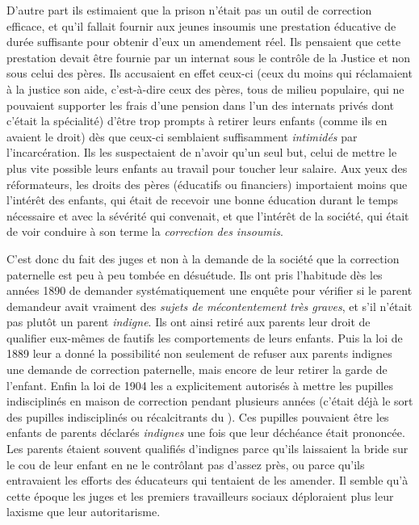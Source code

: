  D'autre part ils estimaient que la prison n'était pas un outil de correction efficace, et qu'il fallait fournir aux jeunes insoumis une prestation éducative de durée suffisante pour obtenir d'eux un amendement réel. Ils pensaient que cette prestation devait être fournie par un internat sous le contrôle de la Justice et non sous celui des pères. Ils accusaient en effet ceux-ci (ceux du moins qui réclamaient à la justice son aide, c'est-à-dire ceux des pères, tous de milieu populaire, qui ne pouvaient supporter les frais d'une pension dans l'un des internats privés dont c'était la spécialité) d'être trop prompts à retirer leurs enfants (comme ils en avaient le droit) dès que ceux-ci semblaient suffisamment \emph{intimidés} par l'incarcération. Ils les suspectaient de n'avoir qu'un seul but, celui de mettre le plus vite possible leurs enfants au travail pour toucher leur salaire. Aux yeux des réformateurs, les droits des pères (éducatifs ou financiers) importaient moins que l'intérêt des enfants, qui était de recevoir une bonne éducation durant le temps nécessaire et avec la sévérité qui convenait, et que l'intérêt de la société, qui était de voir conduire à son terme la \emph{correction des insoumis}. 

 C'est donc du fait des juges et non à la demande de la société que la correction paternelle est peu à peu tombée en désuétude. Ils ont pris l'habitude dès les années 1890 de demander systématiquement une enquête pour vérifier si le parent demandeur avait vraiment des \emph{sujets de mécontentement très graves}, et s'il n'était pas plutôt un parent \emph{indigne}. Ils ont ainsi retiré aux parents leur droit de qualifier eux-mêmes de fautifs les comportements de leurs enfants. Puis la loi de 1889 leur a donné la possibilité non seulement de refuser aux parents indignes une demande de correction paternelle, mais encore de leur retirer la garde de l'enfant. Enfin la loi de 1904 les a explicitement autorisés à mettre les pupilles indisciplinés en maison de correction pendant plusieurs années (c'était déjà le sort des pupilles indisciplinés ou récalcitrants du ). Ces pupilles pouvaient être les enfants de parents déclarés \emph{indignes} une fois que leur déchéance était prononcée. Les parents étaient souvent qualifiés d'indignes parce qu'ils laissaient la bride sur le cou de leur enfant en ne le contrôlant pas d'assez près, ou parce qu'ils entravaient les efforts des éducateurs qui tentaient de les amender. Il semble qu'à cette époque les juges et les premiers travailleurs sociaux déploraient plus leur laxisme que leur autoritarisme. 


